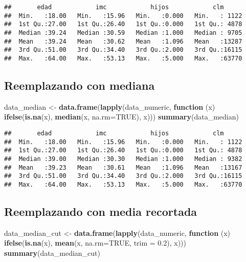 \documentclass[
]{article}
\newenvironment{Shaded}{\begin{snugshade}}{\end{snugshade}}
\newcommand{\AttributeTok}[1]{\textcolor[rgb]{0.13,0.29,0.53}{#1}}
\newcommand{\ConstantTok}[1]{\textcolor[rgb]{0.56,0.35,0.01}{#1}}
\newcommand{\ControlFlowTok}[1]{\textcolor[rgb]{0.13,0.29,0.53}{\textbf{#1}}}
\newcommand{\FloatTok}[1]{\textcolor[rgb]{0.00,0.00,0.81}{#1}}
\newcommand{\FunctionTok}[1]{\textcolor[rgb]{0.13,0.29,0.53}{\textbf{#1}}}
\newcommand{\NormalTok}[1]{#1}
\newcommand{\OtherTok}[1]{\textcolor[rgb]{0.56,0.35,0.01}{#1}}
\begin{document}
\begin{verbatim}
##       edad            imc            hijos            clm       
##  Min.   :18.00   Min.   :15.96   Min.   :0.000   Min.   : 1122  
##  1st Qu.:27.00   1st Qu.:26.40   1st Qu.:0.000   1st Qu.: 4878  
##  Median :39.24   Median :30.59   Median :1.000   Median : 9705  
##  Mean   :39.24   Mean   :30.62   Mean   :1.096   Mean   :13287  
##  3rd Qu.:51.00   3rd Qu.:34.40   3rd Qu.:2.000   3rd Qu.:16115  
##  Max.   :64.00   Max.   :53.13   Max.   :5.000   Max.   :63770
\end{verbatim}

\subsection{Reemplazando con mediana}\label{reemplazando-con-mediana}

\begin{Shaded}
\begin{Highlighting}[]
\NormalTok{data\_median }\OtherTok{\textless{}{-}} \FunctionTok{data.frame}\NormalTok{(}\FunctionTok{lapply}\NormalTok{(data\_numeric, }\ControlFlowTok{function}\NormalTok{ (x) }\FunctionTok{ifelse}\NormalTok{(}\FunctionTok{is.na}\NormalTok{(x), }\FunctionTok{median}\NormalTok{(x, }\AttributeTok{na.rm=}\ConstantTok{TRUE}\NormalTok{), x)))}
\FunctionTok{summary}\NormalTok{(data\_median)}
\end{Highlighting}
\end{Shaded}

\begin{verbatim}
##       edad            imc            hijos            clm       
##  Min.   :18.00   Min.   :15.96   Min.   :0.000   Min.   : 1122  
##  1st Qu.:27.00   1st Qu.:26.40   1st Qu.:0.000   1st Qu.: 4878  
##  Median :39.00   Median :30.30   Median :1.000   Median : 9382  
##  Mean   :39.23   Mean   :30.61   Mean   :1.096   Mean   :13167  
##  3rd Qu.:51.00   3rd Qu.:34.40   3rd Qu.:2.000   3rd Qu.:16115  
##  Max.   :64.00   Max.   :53.13   Max.   :5.000   Max.   :63770
\end{verbatim}

\subsection{Reemplazando con media
recortada}\label{reemplazando-con-media-recortada}

\begin{Shaded}
\begin{Highlighting}[]
\NormalTok{data\_median\_cut }\OtherTok{\textless{}{-}} \FunctionTok{data.frame}\NormalTok{(}\FunctionTok{lapply}\NormalTok{(data\_numeric, }\ControlFlowTok{function}\NormalTok{ (x) }\FunctionTok{ifelse}\NormalTok{(}\FunctionTok{is.na}\NormalTok{(x), }\FunctionTok{mean}\NormalTok{(x, }\AttributeTok{na.rm=}\ConstantTok{TRUE}\NormalTok{, }\AttributeTok{trim =} \FloatTok{0.2}\NormalTok{), x)))}
\FunctionTok{summary}\NormalTok{(data\_median\_cut)}
\end{Highlighting}
\end{Shaded}
\end{document}
